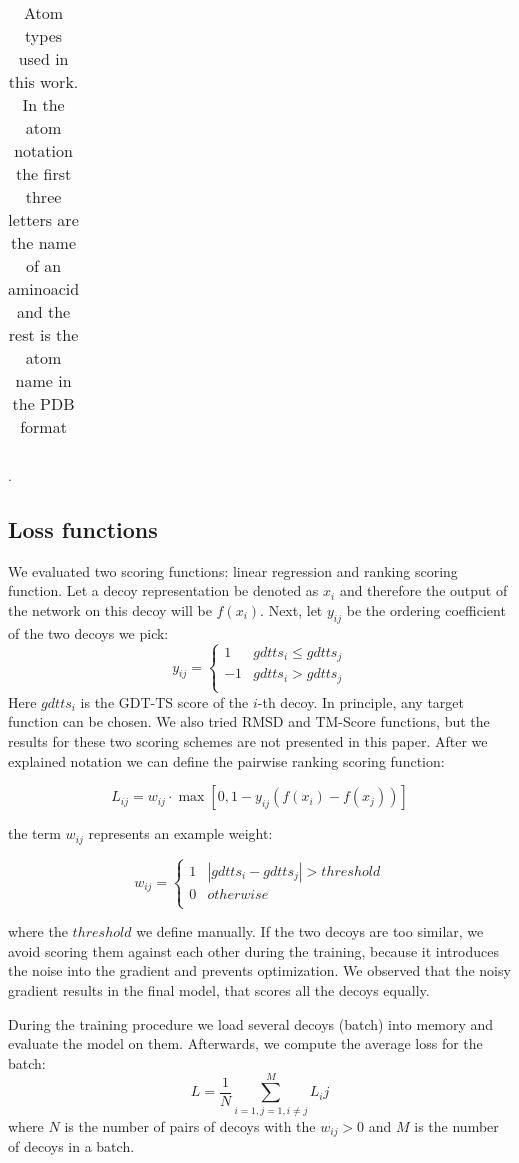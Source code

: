 \documentclass[a4paper,10pt]{article}
\begin{document}
\begin{table}[H]
\begin{center}
\begin{tabular}{ c | l | l }
\end{tabular}
    
    \caption {Atom types used in this work. In the atom notation the first three letters are the name of an aminoacid and the rest is 
    the atom name in the PDB format \cite{}}.
    \label{Tbl:atomTypes}
\end{center}
\end{table}

\subsection{Loss functions}
We evaluated two scoring functions: linear regression and ranking scoring function. Let a decoy representation be denoted as $x_i$ and therefore the output
of the network on this decoy will be $f(x_i)$. Next, let $y_{ij}$ be the ordering coefficient of the two decoys we pick: 
$$
y_{ij} = \begin{cases}
               1& gdtts_i \leq gdtts_j \\
               -1& gdtts_i > gdtts_j \\
            \end{cases}
$$
Here $gdtts_i$ is the GDT-TS score of the $i$-th decoy. In principle, any target function can be chosen. We also tried RMSD and TM-Score functions, but the results for
these two scoring schemes are not presented in this paper. After we explained notation we can define the pairwise ranking scoring function:

$$ L_{ij} = w_{ij} \cdot \max \left[ 0, 1 - y_{ij} \left( f \left( x_i \right) - f \left( x_j \right) \right) \right] $$

the term $w_{ij}$ represents an example weight:

$$
w_{ij} = \begin{cases}
               1& \left| gdtts_i - gdtts_j \right| > threshold \\
               0& otherwise \\ 
            \end{cases}
$$

where the $threshold$ we define manually. If the two decoys are too similar, we avoid scoring them against each other during the training, because it introduces 
the noise into the gradient and prevents optimization. We observed that the noisy gradient results in the final model, that scores all the decoys equally.


During the training procedure we load several decoys (batch) into memory and evaluate the model on them. Afterwards, we compute the average loss for the batch:
$$ L = \frac{1}{N} \sum_{i=1,j=1, i \neq j}^{M} L_ij $$ 
where $N$ is the number of pairs of decoys with the $w_{ij} > 0$ and $M$ is the number of decoys in a batch.
\end{document}
